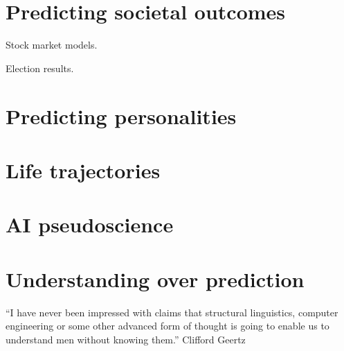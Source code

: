 

\section{Predicting societal outcomes}

Stock market models.

Election results.



\section{Predicting personalities}




\section{Life trajectories}




\section{AI pseudoscience}





\section{Understanding over prediction}
\label{prioritizing understaning}
\begin{displayquote}
``I have never been impressed with claims that structural linguistics, computer engineering or some other advanced form of thought is going to enable us to understand men without knowing them.'' Clifford Geertz \cite{geertz1973interpretation}
\end{displayquote}


